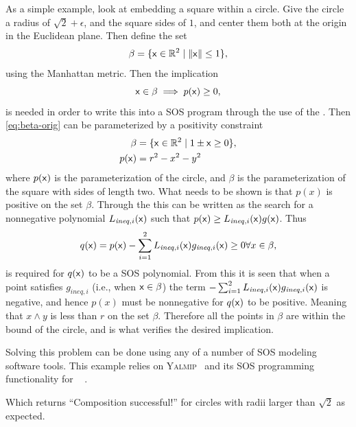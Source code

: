\begin{example}

  As a simple example, look at embedding a square within a circle. Give the
  circle a radius of \(\sqrt{2}+\epsilon\), and the square sides of \(1\), and
  center them both at the origin in the Euclidean plane. Then define the
  set
  \begin{equation}
    \label{eq:beta-orig}
    \beta = \lbrace{\mathbf{\mathsf{x}}} \in \mathbb{R}^2 \mid \lVert{\mathbf{\mathsf{x}}}\rVert \leq 1\rbrace,
  \end{equation} 
  using the Manhattan metric. Then the implication
  \begin{equation}
    {\mathbf{\mathsf{x}}} \in \beta \implies p({\mathbf{\mathsf{x}}}) \geq 0,
  \end{equation}
  is needed in order to write this into a \ac{SOS} program through the use of
  the . Then \eqref{eq:beta-orig} can be parameterized
  by a positivity constraint
  \begin{align}
    \beta &= \lbrace{\mathbf{\mathsf{x}}} \in \mathbb{R}^2 \mid 1 \pm {\mathbf{\mathsf{x}}} \geq 0 \rbrace, \\
    p({\mathbf{\mathsf{x}}}) &= r^2 - x^2 - y^2
  \end{align}
  where \(p({\mathbf{\mathsf{x}}})\) is the parameterization of the circle, and \(\beta\) is
  the parameterization of the square with sides of length two. What needs to be
  shown is that \(p(x)\) is positive on the set \(\beta\). Through the
   this can be written as the search for a nonnegative
  polynomial \(L_{\mathit{\mathit{ineq}},i}({\mathbf{\mathsf{x}}})\) such that \(p({\mathbf{\mathsf{x}}}) \geq
  L_{\mathit{\mathit{ineq}},i}({\mathbf{\mathsf{x}}})g({\mathbf{\mathsf{x}}}) \). Thus
  \begin{equation}
    q({\mathbf{\mathsf{x}}}) = p({\mathbf{\mathsf{x}}}) -
    \sum_{i=1}^{2}L_{\mathit{\mathit{ineq}},i}({\mathbf{\mathsf{x}}})g_{\mathit{\mathit{ineq}},i}({\mathbf{\mathsf{x}}}) \geq 0 \forall x \in \beta,
  \end{equation} 
  is required for \(q({\mathbf{\mathsf{x}}})\) to be a \ac{SOS} polynomial. From this it is
  seen that when a point satisfies \(g_{\mathit{\mathit{ineq}},i}\) (i.e., when
  \({\mathbf{\mathsf{x}}} \in \beta\)) the term \( -
  \sum_{i=1}^{2}L_{\mathit{\mathit{ineq}},i}({\mathbf{\mathsf{x}}})g_{\mathit{\mathit{ineq}},i}({\mathbf{\mathsf{x}}})\)
  is negative, and hence \(p(x)\) must be nonnegative for \(q({\mathbf{\mathsf{x}}})\) to be
  positive. Meaning that \(x \wedge y\) is less than \(r\) on the set \(\beta\).
  Therefore all the points in \(\beta\) are within the bound of the circle, and
  is what verifies the desired implication.

  Solving this problem can be done using any of a number of \ac{SOS} modeling
  software tools. This example relies on \textsc{Yalmip}~\cite{Lofberg2004} and
  its \ac{SOS} programming functionality for \matlab~\cite{Lofberg2009} .


  

  Which returns ``Composition successful!'' for circles with radii larger than
  \(\sqrt{2}\) as expected.
\end{example}


